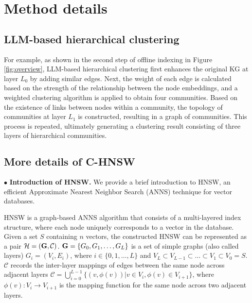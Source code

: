 \appendix
\clearpage
\section{Method details}

\subsection{LLM-based hierarchical clustering}
\label{sec:LHC}

For example, as shown in the second step of offline indexing in Figure \ref{fig:overview}, LLM-based hierarchical clustering first enhances the original KG at layer $L_0$ by adding similar edges.
% 
Next, the weight of each edge is calculated based on the strength of the relationship between the node embeddings, and a weighted clustering algorithm is applied to obtain four communities.
% 
Based on the existence of links between nodes within a community, the topology of communities at layer $L_1$ is constructed, resulting in a graph of communities. 
% 
This process is repeated, ultimately generating a clustering result consisting of three layers of hierarchical communities.


\subsection{More details of C-HNSW}
\label{sec:c_hnsw}


$\bullet$ \textbf{Introduction of HNSW. }
We provide a brief introduction to HNSW, an efficient Approximate Nearest Neighbor Search (ANNS) technique for vector databases.

\begin{definition}
    HNSW is a graph-based ANNS algorithm that consists of a multi-layered index structure, where each node uniquely corresponds to a vector in the database.
    Given a set $S$ containing $n$ vectors, the constructed HNSW can be represented as a pair $\mathcal{H} = (\mathcal{\bf G}, \mathcal{C})$. 
    $\mathcal{\bf G}=\{G_0, G_1, \dots, G_L\}$ is a set of simple graphs (also called layers) $G_i=(V_i, E_i)$, where $i \in \{0,1,\dots, L\}$ and $V_L \subset V_{L-1} \subset \dots \subset V_1 \subset V_0 = S$.
    $\mathcal{C}$ records the inter-layer mappings of edges between the same node across adjacent layers $\mathcal{C} = \bigcup_{i=0}^{L-1} \{(v,\phi(v))|v \in V_i,\phi(v)\in V_{i+1} \}$, where $\phi(v):V_i \rightarrow V_{i+1}$ is the mapping function for the same node across two adjacent layers.
\end{definition}

